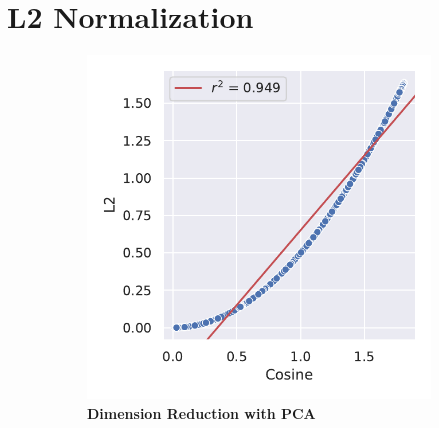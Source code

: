 \section{L2 Normalization} \label{sec:2.4}

\blindtext

\begin{figure}
    \begin{adjustbox}{minipage=\dimexpr{}\fboxrule,fbox}
        \begin{subfigure}[b]{0.475\textwidth}
            \includegraphics[width=\textwidth]{PCA/Difference_Distance_Calculation.pdf}
            \caption[Dimension Reduction with PCA]{\textbf{Dimension Reduction with PCA}}
            \label{fig:2.4.1a}
        \end{subfigure}
        \hfill
        \begin{subfigure}[b]{0.475\textwidth}

\end{subfigure}
\end{adjustbox}
\end{figure}
